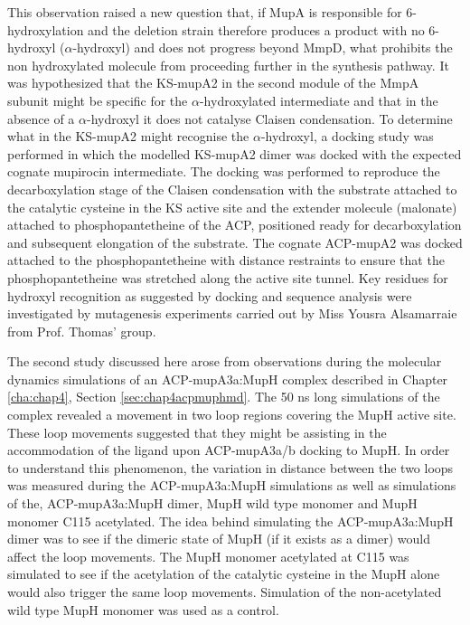 This observation raised a new question that, if MupA is responsible for 6-hydroxylation and the deletion strain therefore produces a product with no 6-hydroxyl ($ \alpha $-hydroxyl) and does not progress beyond MmpD, what prohibits the non hydroxylated molecule from proceeding further in the synthesis pathway. It was hypothesized that the KS-mupA2 in the second module of the MmpA subunit might be specific for the $ \alpha $-hydroxylated intermediate and that in the absence of a $ \alpha $-hydroxyl it does not catalyse Claisen condensation. To determine what in the KS-mupA2 might recognise the $ \alpha $-hydroxyl, a docking study was performed in which the modelled KS-mupA2 dimer was docked with the expected cognate mupirocin intermediate. The docking was performed to reproduce the decarboxylation stage of the Claisen condensation with the substrate attached to the catalytic cysteine in the KS active site and the extender molecule (malonate) attached to phosphopantetheine of the ACP, positioned ready for decarboxylation and subsequent elongation of the substrate. The cognate ACP-mupA2 was docked attached to the phosphopantetheine with distance restraints to ensure that the phosphopantetheine was stretched along the active site tunnel. Key residues for hydroxyl recognition as suggested by docking and sequence analysis were investigated by mutagenesis experiments carried out by Miss Yousra Alsamarraie from Prof. Thomas' group. 

The second study discussed here arose from observations during the molecular dynamics simulations of an ACP-mupA3a:MupH complex described in Chapter \ref{cha:chap4}, Section \ref{sec:chap4acpmuphmd}. The 50 ns long simulations of the complex revealed a movement in two loop regions covering the MupH active site. These loop movements suggested that they might be assisting in the accommodation of the ligand upon ACP-mupA3a/b docking to MupH. In order to understand this phenomenon, the variation in distance between the two loops was measured during the ACP-mupA3a:MupH simulations as well as simulations of the, ACP-mupA3a:MupH dimer, MupH wild type monomer and MupH monomer C115 acetylated. The idea behind simulating the ACP-mupA3a:MupH dimer was to see if the dimeric state of MupH (if it exists as a dimer) would affect the loop movements. The MupH monomer acetylated at C115 was simulated to see if the acetylation of the catalytic cysteine in the MupH alone would also trigger the same loop movements. Simulation of the non-acetylated wild type MupH monomer was used as a control.

